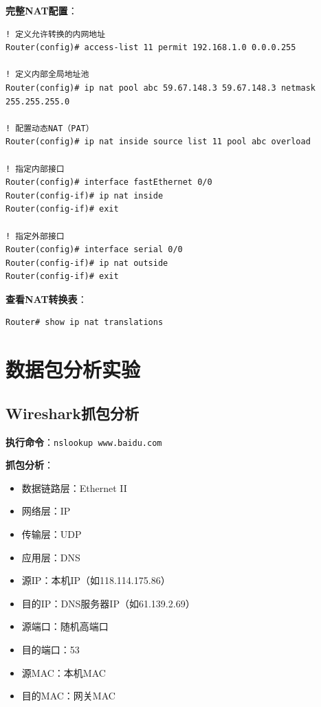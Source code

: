 \documentclass[12pt,a4paper]{ctexart}
\begin{document}
\begin{cmdbox}
\textbf{完整NAT配置}：
\begin{lstlisting}
! 定义允许转换的内网地址
Router(config)# access-list 11 permit 192.168.1.0 0.0.0.255

! 定义内部全局地址池
Router(config)# ip nat pool abc 59.67.148.3 59.67.148.3 netmask 255.255.255.0

! 配置动态NAT（PAT）
Router(config)# ip nat inside source list 11 pool abc overload

! 指定内部接口
Router(config)# interface fastEthernet 0/0
Router(config-if)# ip nat inside
Router(config-if)# exit

! 指定外部接口
Router(config)# interface serial 0/0
Router(config-if)# ip nat outside
Router(config-if)# exit
\end{lstlisting}

\textbf{查看NAT转换表}：
\begin{lstlisting}
Router# show ip nat translations
\end{lstlisting}
\end{cmdbox}

\section{数据包分析实验}

\subsection{Wireshark抓包分析}

\begin{exambox}[DNS查询抓包]
\textbf{执行命令}：\texttt{nslookup www.baidu.com}

\textbf{抓包分析}：
\begin{itemize}[itemsep=0pt]
    \item 数据链路层：Ethernet II
    \item 网络层：IP
    \item 传输层：UDP
    \item 应用层：DNS
    \item 源IP：本机IP（如118.114.175.86）
    \item 目的IP：DNS服务器IP（如61.139.2.69）
    \item 源端口：随机高端口
    \item 目的端口：53
    \item 源MAC：本机MAC
    \item 目的MAC：网关MAC
\end{itemize}
\end{exambox}
\end{document}
